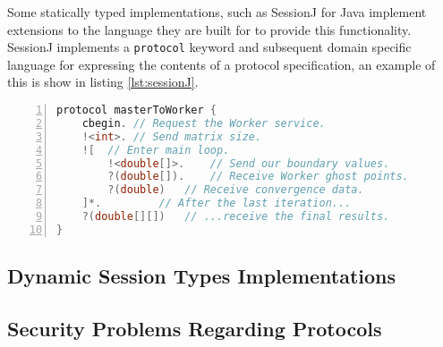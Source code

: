 \documentclass{article}
\begin{document}
	Some statically typed implementations, such as SessionJ\cite{Hu:2010:TES:1883978.1884001} for Java implement extensions to the language they are built for to provide this functionality. SessionJ implements a \texttt{protocol} keyword and subsequent domain specific language for expressing the contents of a protocol specification, an example of this is show in listing \ref{lst:sessionJ}.
	\begin{lstlisting}[language=java, frame=single, numbers=left, caption=An implementation of a Master-Worker ghost points exchange in SessionJ\cite{Hu:2010:TES:1883978.1884001}, label={lst:sessionJ}]
protocol masterToWorker {
	cbegin. // Request the Worker service.
	!<int>. // Send matrix size.
	![ 	// Enter main loop.
		!<double[]>. 	// Send our boundary values.
		?(double[]). 	// Receive Worker ghost points.
		?(double) 	// Receive convergence data.
	]*. 		// After the last iteration...
	?(double[][]) 	// ...receive the final results.
}

	\end{lstlisting}
	\subsection{Dynamic Session Types Implementations}
	\subsection{Security Problems Regarding Protocols}
	\pagebreak
	\printbibliography
\end{document}
